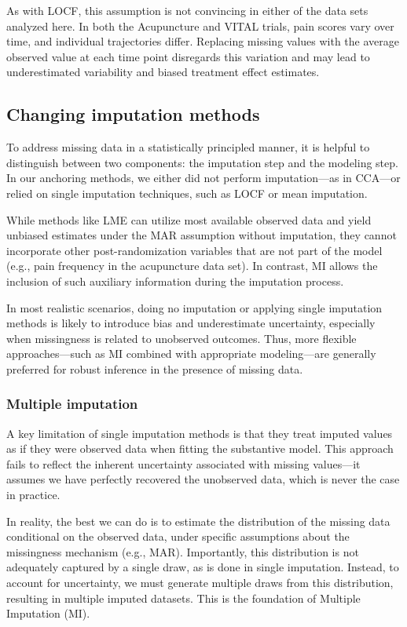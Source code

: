 \documentclass{article}
\begin{document}
As with LOCF, this assumption is not convincing in either of the data
sets analyzed here. In both the Acupuncture and VITAL trials, pain
scores vary over time, and individual trajectories differ. Replacing
missing values with the average observed value at each time point
disregards this variation and may lead to underestimated variability and
biased treatment effect estimates.

\subsection{Changing imputation
methods}\label{changing-imputation-methods}

To address missing data in a statistically principled manner, it is
helpful to distinguish between two components: the imputation step and
the modeling step. In our anchoring methods, we either did not perform
imputation---as in CCA---or relied on single imputation techniques, such
as LOCF or mean imputation.

While methods like LME can utilize most available observed data and
yield unbiased estimates under the MAR assumption without imputation,
they cannot incorporate other post-randomization variables that are not
part of the model (e.g., pain frequency in the acupuncture data set). In
contrast, MI allows the inclusion of such auxiliary information during
the imputation process.

In most realistic scenarios, doing no imputation or applying single
imputation methods is likely to introduce bias and underestimate
uncertainty, especially when missingness is related to unobserved
outcomes. Thus, more flexible approaches---such as MI combined with
appropriate modeling---are generally preferred for robust inference in
the presence of missing data.

\subsubsection{Multiple imputation}\label{multiple-imputation}

A key limitation of single imputation methods is that they treat imputed
values as if they were observed data when fitting the substantive model.
This approach fails to reflect the inherent uncertainty associated with
missing values---it assumes we have perfectly recovered the unobserved
data, which is never the case in practice.

In reality, the best we can do is to estimate the distribution of the
missing data conditional on the observed data, under specific
assumptions about the missingness mechanism (e.g., MAR). Importantly,
this distribution is not adequately captured by a single draw, as is
done in single imputation. Instead, to account for uncertainty, we must
generate multiple draws from this distribution, resulting in multiple
imputed datasets. This is the foundation of Multiple Imputation (MI).
\end{document}
